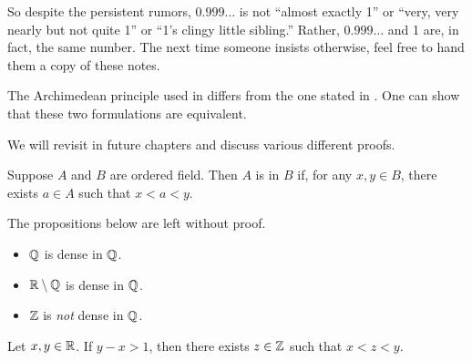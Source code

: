 \begin{remark}
  So despite the persistent rumors, $0.999\ldots$ is not
  ``almost exactly 1'' or ``very, very nearly but not quite 1'' or
  ``1's clingy little sibling.'' Rather, $0.999\ldots$ and 1 are, in
  fact, the same number. The next time someone insists otherwise,
  feel free to hand them a copy of these notes.
\end{remark}

\begin{remark}
  The Archimedean principle used in  differs from
  the one stated in . One can show that
  these two formulations are equivalent.
\end{remark}

\begin{remark}
  We will revisit  in future chapters and discuss
  various different proofs.
\end{remark}

\begin{definition}[Density]
  Suppose $A$ and $B$ are ordered field. Then $A$ is  in
  $B$ if, for any $x, y \in B$, there exists $a \in A$ such that $x < a < y$.
\end{definition}

\begin{example}
  The propositions below are left without proof.
  \begin{itemize}
    \item $\mathbb Q$ is dense in $\mathbb Q$.
    \item $\mathbb R \setminus \mathbb Q$ is dense in $\mathbb Q$.
    \item $\mathbb Z$ is \textit{not} dense in $\mathbb Q$.
  \end{itemize}
\end{example}

\begin{lemma}
  Let $x, y \in \mathbb R$. If $y - x > 1$, then there exists $z \in \mathbb Z$
  such that $x < z < y$.
\end{lemma}

